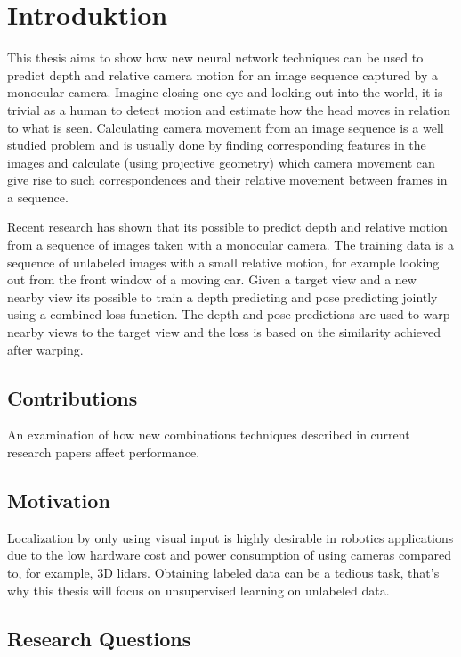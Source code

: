 \chapter{Introduktion}\label{cha:intro}

This thesis aims to show how new neural network techniques can be used to predict depth and relative camera motion for an image sequence captured by a monocular \abbrRGB camera. Imagine closing one eye and looking out into the world, it is trivial as a human to detect motion and estimate how the head moves in relation to what is seen. Calculating camera movement from an image sequence is a well studied problem and is usually done by finding corresponding features in the images and calculate (using projective geometry) which camera movement can give rise to such correspondences and their relative movement between frames in a sequence.

Recent research has shown that its possible to predict depth and relative motion from a sequence of images taken with a monocular \abbrRGB camera. The training data is a sequence of unlabeled images with a small relative motion, for example looking out from the front window of a moving car. Given a target view and a new nearby view its possible to train a depth predicting and pose predicting \abbrCNN jointly using a combined loss function. The depth and pose predictions are used to warp nearby views to the target view and the loss is based on the similarity achieved after warping.

\section{Contributions}

An examination of how new combinations techniques described in current research papers affect performance.

\section{Motivation}

Localization by only using visual input is highly desirable in robotics applications due to the low hardware cost and power consumption of using cameras compared to, for example, 3D lidars. Obtaining labeled data can be a tedious task, that's why this thesis will focus on unsupervised learning on unlabeled data.

\section{Research Questions}

